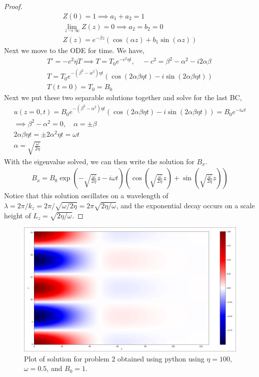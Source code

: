 \documentclass{article}
\begin{document}
\begin{proof}
\begin{gather*}
        Z(0) = 1 \implies a_1 + a_2 = 1\\
        \lim_{z\to\infty}Z(z) = 0 \implies a_2 = b_2 = 0\\
        Z(z) = e^{-\beta z}\left(\cos(\alpha z) + b_1\sin(\alpha z)\right)
    \end{gather*}
    Next we move to the ODE for time. We have, 
    \begin{gather*}
        T' = -c^2\eta T \implies T = T_0e^{-c^2\eta t}, \quad -c^2 = \beta^2 -
        \alpha^2 -  i2\alpha\beta \\
        T = T_0e^{-(\beta^2 - \alpha^2)\eta t}\left(\cos(2\alpha\beta\eta t)
        - i\sin(2\alpha\beta\eta t)\right)\\
        T(t=0) = T_0 = B_0
    \end{gather*}
    Next we put these two separable solutions together and solve for the last
    BC,
    \begin{gather*}
        u(z=0,t) = B_0e^{-(\beta^2-\alpha^2)\eta t}\left(\cos(2\alpha\beta\eta t)
        - i\sin(2\alpha\beta\eta t)\right) = B_0e^{-i\omega t} \\
        \implies \beta^2 - \alpha^2 = 0, \quad \alpha = \pm \beta \\
        2\alpha\beta\eta t = \pm 2\alpha^2\eta t = \omega t\\
        \alpha = \sqrt{\frac{\omega}{2\eta}}
    \end{gather*}
    With the eigenvalue solved, we can then write the solution for $B_x$. 
    \begin{gather*}
        B_x = B_0\exp\left(-\sqrt{\frac{\omega}{2\eta}}z - i\omega
        t\right)\left(\cos\left(\sqrt{\frac{\omega}{2\eta}}z\right) + 
        \sin\left(\sqrt{\frac{\omega}{2\eta}}z\right)\right)
    \end{gather*}
    Notice that this solution oscillates on a wavelength of $\lambda = 2\pi/k_z =
    2\pi/\sqrt{\omega/2\eta} = 2\pi\sqrt{2\eta/\omega}$, and the exponential
    decay occurs on a scale height of $L_z = \sqrt{2\eta/\omega}$. 
\end{proof}

\begin{figure}
    \centering
    \includegraphics[width=1\textwidth]{hw1p5_plot.png}
    \caption{Plot of solution for problem 2 obtained using python using $\eta =
    100$, $\omega = 0.5$, and $B_0 = 1$.}
\end{figure}
\end{document}
